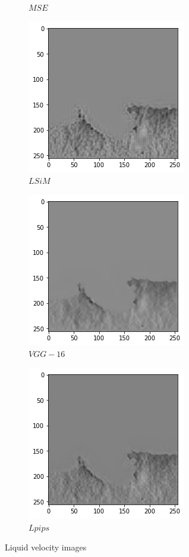 \documentclass[a4paper,12pt,twoside]{report}
\begin{document}
\begin{figure}
\begin{subfigure}{0.32\textwidth}
		\caption{$MSE$}
	\end{subfigure}
	\begin{subfigure}{0.32\textwidth}
		\centering
		\includegraphics[scale=0.4]{superresolution/liquidvel_lsim.png}
		\caption{$LSiM$}
	\end{subfigure}
	\begin{subfigure}{0.32\textwidth}
		\centering
		\includegraphics[scale=0.4]{superresolution/liquidvel_vgg.png}
		\caption{$VGG-16$}
	\end{subfigure}
	\begin{subfigure}{0.32\textwidth}
		\centering
		\includegraphics[scale=0.4]{superresolution/liquidvel_lpips.png}
		\caption{$Lpips$}
	\end{subfigure}
	\caption{Liquid velocity images}
\end{figure}
\end{document}
